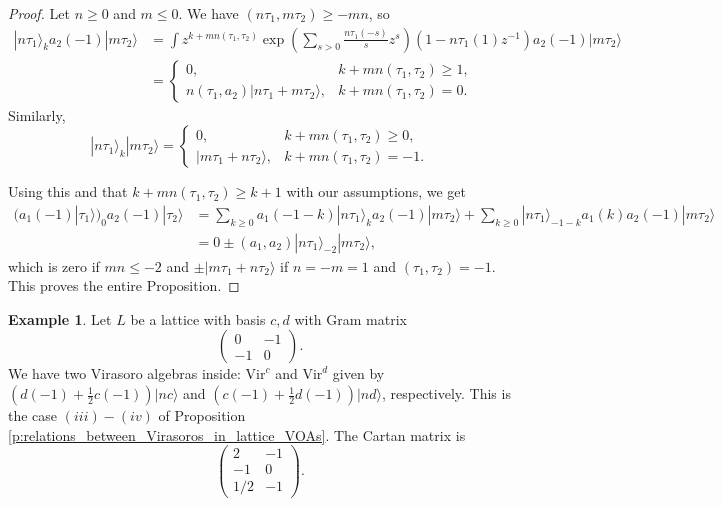 \documentclass[11pt]{amsart}
\newcommand{\ket}[1]{|#1\rangle}
\renewcommand{\le}{\leqslant}
\renewcommand{\ge}{\geqslant}
\newcommand{\Vir}{\mathrm{Vir}}
\newcommand{\mat}[4]{\begin{pmatrix} #1 & #2 \\ #3 & #4 \end{pmatrix}}
\numberwithin{equation}{section}
\theoremstyle{plain}
\theoremstyle{definition}
\newtheorem{example}[theorem]{Example}
\begin{document}
\begin{proof}
    Let $n\ge 0$ and $m\le 0$. We have $(n\tau_1,m\tau_2)\ge -mn$, so
    \begin{align*}
        \ket{n\tau_1}_ka_2(-1)\ket{m\tau_2}&=\int z^{k+mn(\tau_1,\tau_2)}\exp\left(\sum_{s>0}\frac{n\tau_1(-s)}sz^{s}\right)\left(1-n\tau_1(1)z^{-1}\right)a_2(-1)\ket{m\tau_2}\\
        &=\begin{cases}
            0,&k+mn(\tau_1,\tau_2)\ge 1,\\
             n(\tau_1,a_2)\ket{n\tau_1+m\tau_2},&k+mn(\tau_1,\tau_2)=0.
        \end{cases}
    \end{align*}
    Similarly,
    $$
    \ket{n\tau_1}_k\ket{m\tau_2}=\begin{cases}
        0,&k+mn(\tau_1,\tau_2)\ge 0,\\
        \ket{m\tau_1+n\tau_2},&k+mn(\tau_1,\tau_2)=-1.
    \end{cases}
    $$
    
    Using this and that $k+mn(\tau_1,\tau_2)\ge k+1$ with our assumptions, we get
    \begin{align*}
        (a_1(-1)\ket{\tau_1})_0a_2(-1)\ket{\tau_2}&=\sum_{k\ge 0}a_1(-1-k)\ket{n\tau_1}_ka_2(-1)\ket{m\tau_2}+\sum_{k\ge 0}\ket{n\tau_1}_{-1-k}a_1(k)a_2(-1)\ket{m\tau_2}\\
        &=0\pm(a_1,a_2)\ket{n\tau_1}_{-2}\ket{m\tau_2},
    \end{align*}
    which is zero if $mn\le -2$ and $\pm \ket{m\tau_1+n\tau_2}$ if $n=-m=1$ and $(\tau_1,\tau_2)=-1$. This proves the entire Proposition.
\end{proof}


\begin{example}
    Let $L$ be a lattice with basis $c,d$ with Gram matrix
    $$
    \mat0{-1}{-1}0.
    $$
    We have two Virasoro algebras inside: $\Vir^c$ and $\Vir^d$ given by $(d(-1)+\tfrac12c(-1))\ket{nc}$ and $(c(-1)+\tfrac12d(-1))\ket{nd}$, respectively. This is the case $(iii)-(iv)$ of Proposition \ref{p:relations_between_Virasoros_in_lattice_VOAs}. The Cartan matrix is
    $$
    \begin{pmatrix}
            2&-1\\
            -1&0\\
            1/2&-1
    \end{pmatrix}.
    $$
\end{example}
\end{document}
